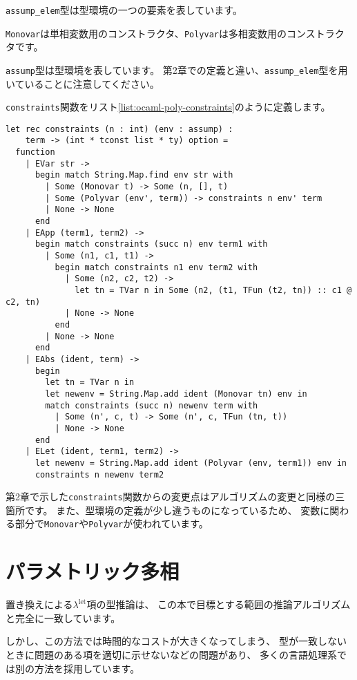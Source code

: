 \texttt{assump\_elem}型は型環境の一つの要素を表しています。

\texttt{Monovar}は単相変数用のコンストラクタ、\texttt{Polyvar}は多相変数用のコンストラクタです。

\texttt{assump}型は型環境を表しています。
第2章での定義と違い、\texttt{assump\_elem}型を用いていることに注意してください。

\texttt{constraints}関数をリスト\ref{list:ocaml-poly-constraints}のように定義します。

\begin{lstlisting}[caption=制約の生成, label=list:ocaml-poly-constraints]
let rec constraints (n : int) (env : assump) :
    term -> (int * tconst list * ty) option =
  function
    | EVar str ->
      begin match String.Map.find env str with
        | Some (Monovar t) -> Some (n, [], t)
        | Some (Polyvar (env', term)) -> constraints n env' term
        | None -> None
      end
    | EApp (term1, term2) ->
      begin match constraints (succ n) env term1 with
        | Some (n1, c1, t1) ->
          begin match constraints n1 env term2 with
            | Some (n2, c2, t2) ->
              let tn = TVar n in Some (n2, (t1, TFun (t2, tn)) :: c1 @ c2, tn)
            | None -> None
          end
        | None -> None
      end
    | EAbs (ident, term) ->
      begin
        let tn = TVar n in
        let newenv = String.Map.add ident (Monovar tn) env in
        match constraints (succ n) newenv term with
          | Some (n', c, t) -> Some (n', c, TFun (tn, t))
          | None -> None
      end
    | ELet (ident, term1, term2) ->
      let newenv = String.Map.add ident (Polyvar (env, term1)) env in
      constraints n newenv term2
\end{lstlisting}

第2章で示した\texttt{constraints}関数からの変更点はアルゴリズムの変更と同様の三箇所です。
また、型環境の定義が少し違うものになっているため、
変数に関わる部分で\texttt{Monovar}や\texttt{Polyvar}が使われています。

\section{パラメトリック多相}

置き換えによる$\lambda^\mathrm{let}$項の型推論は、
この本で目標とする範囲の推論アルゴリズムと完全に一致しています。

しかし、この方法では時間的なコストが大きくなってしまう、
型が一致しないときに問題のある項を適切に示せないなどの問題があり、
多くの言語処理系では別の方法を採用しています。

